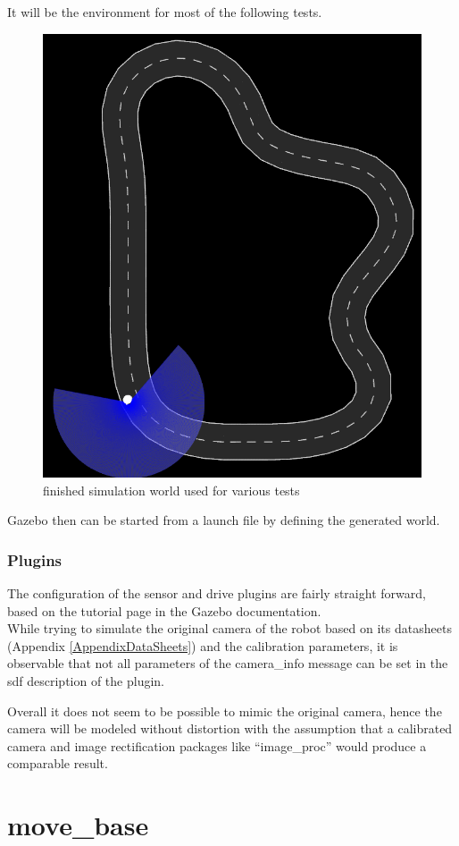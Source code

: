 It will be the environment for most of the following tests.

\begin{figure}
	\centering
	\includegraphics[width=.5\textwidth]{Pictures/test track}
	\caption{finished simulation world used for various tests}
	\label{simworld}
\end{figure}

Gazebo then can be started from a launch file by defining the generated world.\\

\subsubsection{Plugins}
The configuration of the sensor and drive plugins are fairly straight forward, based on the tutorial page in the Gazebo documentation\cite{gazebotutorial}.\\



While trying to simulate the original camera of the robot based on its datasheets (Appendix \ref{AppendixDataSheets}) and the calibration parameters, it is observable that not all parameters of the camera\_info message can be set in the sdf description of the plugin.

Overall it does not seem to be possible to mimic the original camera, hence the camera will be modeled without distortion with the assumption that a calibrated camera and image rectification packages like ``image\_proc'' would produce a comparable result.








\section{move\_base}

